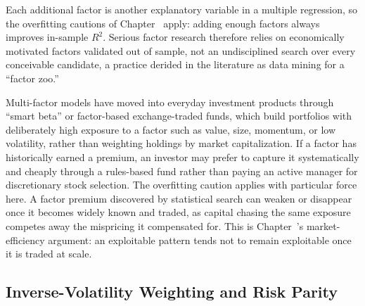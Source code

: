 \documentclass[../ai_in_finance]{subfiles}
\begin{document}
Each additional factor is another explanatory variable in a multiple regression, so the overfitting cautions of Chapter~ apply: adding enough factors always improves in-sample $R^2$. Serious factor research therefore relies on economically motivated factors validated out of sample, not an undisciplined search over every conceivable candidate, a practice derided in the literature as data mining for a ``factor zoo.''

Multi-factor models have moved into everyday investment products through ``smart beta'' or factor-based exchange-traded funds, which build portfolios with deliberately high exposure to a factor such as value, size, momentum, or low volatility, rather than weighting holdings by market capitalization.
If a factor has historically earned a premium, an investor may prefer to capture it systematically and cheaply through a rules-based fund rather than paying an active manager for discretionary stock selection.
The overfitting caution applies with particular force here. A factor premium discovered by statistical search can weaken or disappear once it becomes widely known and traded, as capital chasing the same exposure competes away the mispricing it compensated for. This is Chapter~'s market-efficiency argument: an exploitable pattern tends not to remain exploitable once it is traded at scale.

\subsection{Inverse-Volatility Weighting and Risk Parity}
\label{sec:risk-parity}
\end{document}
